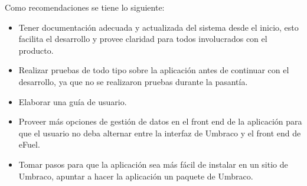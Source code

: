 Como recomendaciones se tiene lo siguiente:
\begin{itemize}
    \item Tener documentación adecuada y actualizada del sistema desde el inicio, esto facilita el desarrollo y provee claridad para todos involucrados con el producto.
    \item Realizar pruebas de todo tipo sobre la aplicación antes de continuar con el desarrollo, ya que no se realizaron pruebas durante la pasantía.
    \item Elaborar una guía de usuario.
    \item Proveer más opciones de gestión de datos en el front end de la aplicación para que el usuario no deba alternar entre la interfaz de Umbraco y el front end de eFuel.
    \item Tomar pasos para que la aplicación sea más fácil de instalar en un sitio de Umbraco, apuntar a hacer la aplicación un paquete de Umbraco.
\end{itemize}
